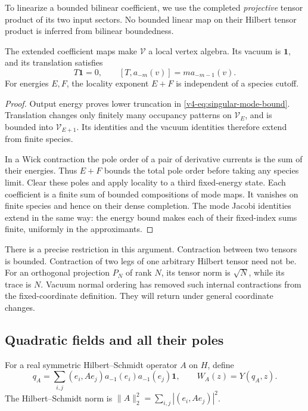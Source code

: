 To linearize a bounded bilinear coefficient,
we use the completed \emph{projective} tensor
product of its two input sectors.
No bounded linear map on their Hilbert
tensor product is inferred from bilinear boundedness.

\begin{theorem}\label{v4-thm:singular-hilbert-vertex}
The extended coefficient maps make \(\mathcal V\)
a local vertex algebra. Its vacuum is \(\mathbf1\),
and its translation satisfies
\[
 T\mathbf1=0,\qquad
 [T,a_{-m}(v)]=m a_{-m-1}(v).
\]
For energies \(E,F\), the locality exponent \(E+F\)
is independent of a species cutoff.
\end{theorem}

\begin{proof}
Output energy proves lower truncation in
\eqref{v4-eq:singular-mode-bound}. Translation changes
only finitely many occupancy patterns on
\(\mathcal V_E\), and is bounded into
\(\mathcal V_{E+1}\). Its identities and the vacuum
identities therefore extend from finite species.

In a Wick contraction the pole order of a pair
of derivative currents is the sum of their
energies. Thus \(E+F\) bounds the total pole
order before taking any species limit.
Clear these poles and apply locality to a
third fixed-energy state. Each coefficient
is a finite sum of bounded compositions
of mode maps. It vanishes on finite species
and hence on their dense completion. The mode
Jacobi identities extend in the same way: the
energy bound makes each of their fixed-index
sums finite, uniformly in the approximants.
\end{proof}

There is a precise restriction in this argument.
Contraction between two tensors is bounded.
Contraction of two legs of one arbitrary Hilbert
tensor need not be. For an orthogonal projection
\(P_N\) of rank \(N\), its tensor norm is
\(\sqrt N\), while its trace is \(N\).
Vacuum normal ordering has removed such internal
contractions from the fixed-coordinate definition.
They will return under general coordinate changes.

\subsection{Quadratic fields and all their poles}

For a real symmetric Hilbert--Schmidt operator
\(A\) on \(H\), define
\begin{equation}\label{v4-eq:singular-quadratic-state}
 q_A=\sum_{i,j}(e_i,Ae_j)
        a_{-1}(e_i)a_{-1}(e_j)\mathbf1,
 \qquad W_A(z)=Y(q_A,z).
\end{equation}
The Hilbert--Schmidt norm is
\(\|A\|_2^2=\sum_{i,j}|(e_i,Ae_j)|^2\).

